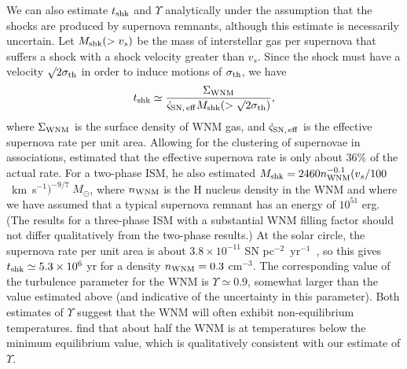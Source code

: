 \documentclass[12pt,preprint,flushrt]{aastex}
\newcommand{\beq}{\begin{equation}}
\newcommand{\eeq}{\end{equation}}
\newcommand{\e}{$^{-1}$}
\newcommand{\ee}{$^{-2}$}
\newcommand{\eee}{$^{-3}$}
\newcommand{\sth}{\sigma_{\rm th}}
\begin{document}
     We can also estimate $t_{\rm shk}$ and $\Upsilon$ analytically
under the assumption that the shocks are produced by supernova
remnants, although this estimate is necessarily 
uncertain.  Let $M_{\rm shk}(>v_s)$ be the mass of
interstellar gas per supernova that suffers
a shock with a shock velocity greater than $v_s$.  
Since the shock must have a velocity $\surd 2\sth$ in order
to induce motions of $\sth$, we have
\beq
t_{\rm shk}\simeq\frac{\Sigma_{\rm WNM}}{\dot\varsigma_{\rm SN,\, eff}
       M_{\rm shk}(>\surd 2 \sth)},
\label{eq:tshk}
\eeq
where $\Sigma_{\rm WNM}$ is the surface density of WNM gas,
and $\dot\varsigma_{\rm SN,\, eff}$ is the effective supernova
rate per unit area.  Allowing for the clustering of supernovae
in associations, \cite{mck89} estimated that the effective
supernova rate is only about 36\% of the actual rate.  For
a two-phase ISM, he also estimated $M_{\rm shk}=2460 n_{\rm WNM}^{-0.1}
(v_s/100$~km~s\e$)^{-9/7}\;M_\odot$,
where $n_{\rm WNM}$ is the H nucleus density in the WNM and
where we have assumed that a typical
supernova remnant has an energy of $10^{51}$ erg.  
(The results for a three-phase ISM 
with a substantial WNM filling factor should not differ qualitatively
from the two-phase results.)
At the solar circle,
the supernova rate per unit area is about $3.8\times 10^{-11}$ SN
pc\ee\ yr\e\ \citep{mck97}, so
this gives $t_{\rm shk}\simeq 5.3\times 10^6$ yr for a density
$n_{\rm WNM}=0.3$ cm\eee.  The corresponding value of
the turbulence parameter for the WNM is 
$\Upsilon\simeq 0.9$, somewhat larger than the value estimated above
(and indicative of the uncertainty in this parameter).
Both estimates of $\Upsilon$ suggest that
the WNM will often exhibit non-equilibrium temperatures.
\cite{hei02} find that about half the WNM is at temperatures
below the minimum equilibrium value, which is qualitatively consistent
with our estimate of $\Upsilon$.
\end{document}
